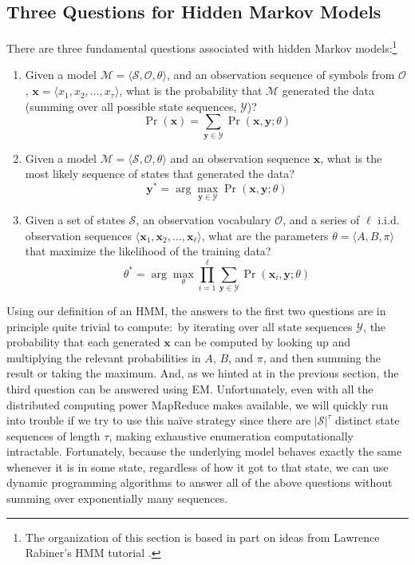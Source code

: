 \subsection{Three Questions for Hidden Markov Models}

There are three fundamental questions associated with hidden Markov
models:\footnote{The organization of this section is based in part on
  ideas from Lawrence Rabiner's HMM tutorial \cite{Rabiner_1990}.}

\begin{enumerate}
\item Given a model $\mathcal{M} = \langle \mathcal{S}, \mathcal{O}, \theta \rangle$, and an observation sequence of symbols from $\mathcal{O}$, $\textbf{x} = \langle x_1 , x_2 , \ldots , x_{\tau} \rangle$, what is the probability that $\mathcal{M}$ generated the data (summing over all possible state sequences, $\mathcal{Y}$)?
\begin{equation}
\Pr(\textbf{x}) = \sum_{\textbf{y} \in \mathcal{Y}}\Pr(\textbf{x},\textbf{y};\theta)
\end{equation}
\item Given a model $\mathcal{M} = \langle \mathcal{S}, \mathcal{O}, \theta \rangle$ and an observation sequence $\textbf{x}$, what is the most likely sequence of states that generated the data?
\begin{equation}
\textbf{y}^* = \arg \max_{\textbf{y} \in \mathcal{Y}} \Pr(\textbf{x},\textbf{y};\theta)
\end{equation}
\item Given a set of states $\mathcal{S}$, an observation vocabulary $\mathcal{O}$, and a series of $\ell$ i.i.d. observation sequences $\langle \textbf{x}_1,\textbf{x}_2,\ldots, \textbf{x}_{\ell} \rangle$, what are the parameters $\theta=\langle A, B, \pi \rangle$ that maximize the likelihood of the training data?
\begin{equation}
\theta^* = \arg \max_{\theta} \prod_{i=1}^{\ell} \sum_{\textbf{y} \in \mathcal{Y}} \Pr(\textbf{x}_i,\textbf{y};\theta)
\end{equation}
\end{enumerate}

\noindent Using our definition of an HMM, the answers to the first two
questions are in principle quite trivial to compute:\ by iterating
over all state sequences $\mathcal{Y}$, the probability that each
generated $\textbf{x}$ can be computed by looking up and multiplying
the relevant probabilities in $A$, $B$, and $\pi$, and then summing
the result or taking the maximum. And, as we hinted at in the previous
section, the third question can be answered using EM.  Unfortunately,
even with all the distributed computing power MapReduce makes
available, we will quickly run into trouble if we try to use this
na\"ive strategy since there are $|\mathcal{S}|^{\tau}$ distinct state
sequences of length $\tau$, making exhaustive enumeration
computationally intractable. Fortunately, because the underlying model
behaves exactly the same whenever it is in some state, regardless of
how it got to that state, we can use dynamic programming algorithms to
answer all of the above questions without summing over exponentially
many sequences.

